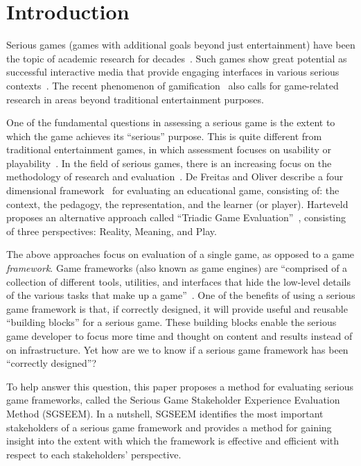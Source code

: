 \documentclass{sigchi}
\begin{document}

\section{Introduction}

Serious games (games with additional goals beyond just entertainment) have been the topic
of academic research for decades~\cite{Zyda2005}. Such games show great potential as
successful interactive media that provide engaging interfaces in various serious
contexts~\cite{mcgonigal2011reality,reeves2009total}. The recent phenomenon of
gamification~\cite{Deterding2011mt} also calls for game-related research in areas beyond
traditional entertainment purposes.

One of the fundamental questions in assessing a serious game is the extent to which the
game achieves its ``serious'' purpose.  This is quite different from 
traditional entertainment games, in which assessment focuses on usability or
playability~\cite{song2007new}. In the field of serious games, there is an increasing
focus on the methodology of research and evaluation~\cite{Mayer2012233}. De Freitas and
Oliver describe a four dimensional framework~\cite{de2006can} for evaluating an
educational game, consisting of: the context, the pedagogy, the representation, and the
learner (or player). Harteveld proposes an alternative approach called ``Triadic Game
Evaluation''~\cite{harteveld2010triadic}, consisting of three perspectives: Reality,
Meaning, and Play.

The above approaches focus on evaluation of a single game, as opposed to a game {\em
  framework}. Game frameworks (also known as game engines) are ``comprised of a collection
of different tools, utilities, and interfaces that hide the low-level details of the
various tasks that make up a game''~\cite{sherrod2006ultimate}. One of the benefits of
using a serious game framework is that, if correctly designed, it will provide useful and
reusable ``building blocks'' for a serious game.  These building blocks enable the serious
game developer to focus more time and thought on content and results instead of on
infrastructure.  Yet how are we to know if a serious game framework has been ``correctly designed''?

To help answer this question, this paper proposes a method for evaluating serious game
frameworks, called the Serious Game Stakeholder Experience Evaluation Method (SGSEEM). In
a nutshell, SGSEEM identifies the most important stakeholders of a serious game framework
and provides a method for gaining insight into the extent with which the framework is
effective and efficient with respect to each stakeholders' perspective.
\end{document}
